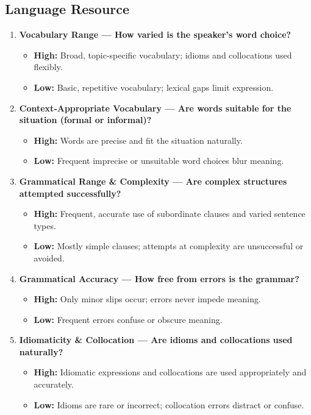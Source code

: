 \documentclass{report}
\begin{document}
\subsection*{Language Resource}
\begin{enumerate}
  \item \textbf{Vocabulary Range — How varied is the speaker’s word choice?}
  \begin{itemize}
    \item \textbf{High:} Broad, topic‑specific vocabulary; idioms and collocations used flexibly.
    \item \textbf{Low:} Basic, repetitive vocabulary; lexical gaps limit expression.
  \end{itemize}

  \item \textbf{Context‑Appropriate Vocabulary — Are words suitable for the situation (formal or informal)?}
  \begin{itemize}
    \item \textbf{High:} Words are precise and fit the situation naturally.
    \item \textbf{Low:} Frequent imprecise or unsuitable word choices blur meaning.
  \end{itemize}

  \item \textbf{Grammatical Range \& Complexity — Are complex structures attempted successfully?}
  \begin{itemize}
    \item \textbf{High:} Frequent, accurate use of subordinate clauses and varied sentence types.
    \item \textbf{Low:} Mostly simple clauses; attempts at complexity are unsuccessful or avoided.
  \end{itemize}

  \item \textbf{Grammatical Accuracy — How free from errors is the grammar?}
  \begin{itemize}
    \item \textbf{High:} Only minor slips occur; errors never impede meaning.
    \item \textbf{Low:} Frequent errors confuse or obscure meaning.
  \end{itemize}

  \item \textbf{Idiomaticity \& Collocation — Are idioms and collocations used naturally?}
  \begin{itemize}
    \item \textbf{High:} Idiomatic expressions and collocations are used appropriately and accurately.
    \item \textbf{Low:} Idioms are rare or incorrect; collocation errors distract or confuse.
  \end{itemize}


\end{enumerate}
\end{document}
